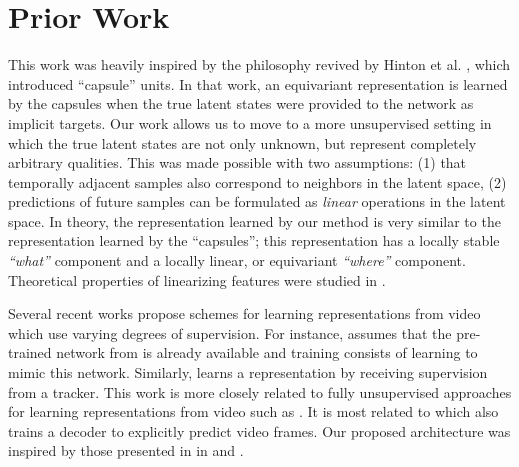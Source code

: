 \documentclass{article} %
\begin{document}
\section{Prior Work}
\label{sec:prior work} 
This work was heavily inspired by the philosophy revived by Hinton et al. \cite{capsules}, which introduced ``capsule'' units. In that work, an equivariant
representation is learned by the capsules when the true latent states were provided to the network as implicit targets. Our work allows us to move to a more unsupervised setting in which the true latent states are not only unknown, but represent completely arbitrary qualities. This was made possible with two assumptions: (1) that temporally adjacent samples also correspond to neighbors in the latent space, (2) predictions of future samples can be formulated as \emph{linear} operations in the latent space. In theory, the representation learned by our method is very similar to the representation learned by the ``capsules''; this representation has a locally stable \emph{``what''} component and a locally linear, or equivariant
 \emph{``where''} component. Theoretical properties of linearizing features were studied in \cite{taco}.    

Several recent works propose schemes for learning representations from video which use varying degrees of supervision\cite{FBvideo}\cite{supFromTracker}\cite{predAlexNet}\cite{slowAE}. For instance, \cite{predAlexNet} assumes that the pre-trained network from \cite{ImageNet} is already available and training consists of learning to mimic this network. Similarly, \cite{supFromTracker} learns a representation by receiving supervision from a tracker. This work is more closely related to fully unsupervised approaches for learning representations from video such as \cite{slowAE}\cite{SSA}\cite{Cadieu}\cite{SFA}\cite{DrLIMVideo}. It is most related to \cite{FBvideo} which also trains a decoder to explicitly predict video frames. Our proposed architecture was inspired by those presented in in \cite{ranzato2007} and \cite{zeiler2010}. 
\end{document}
